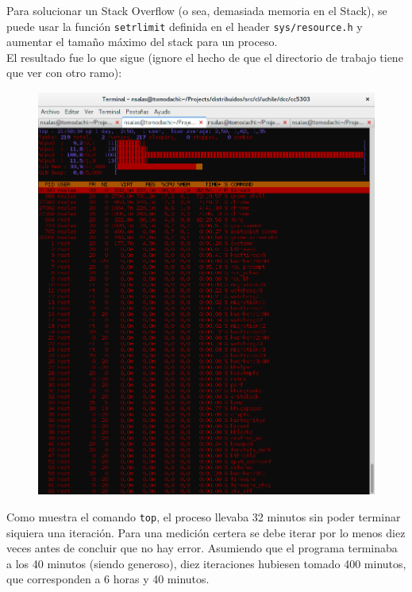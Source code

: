 \documentclass[12pt,letterpaper]{report}
\begin{document}
Para solucionar un Stack Overflow (o sea, demasiada memoria en el Stack), se puede usar la función \texttt{setrlimit} definida en el header \texttt{sys/resource.h} y aumentar el tamaño máximo del stack para un proceso.\\

El resultado fue lo que sigue (ignore el hecho de que el directorio de trabajo tiene que ver con otro ramo):

\begin{figure}[H]
\begin{center}
\includegraphics[scale=0.4]{tiempo_abb_degenerado.png}
\end{center}
\end{figure}

Como muestra el comando \texttt{top}, el proceso llevaba 32 minutos sin poder terminar siquiera una iteración. Para una medición certera se debe iterar por lo menos diez veces antes de concluir que no hay error. Asumiendo que el programa terminaba a los 40 minutos (siendo generoso), diez iteraciones hubiesen tomado 400 minutos, que corresponden a 6 horas y 40 minutos.\\
\end{document}
